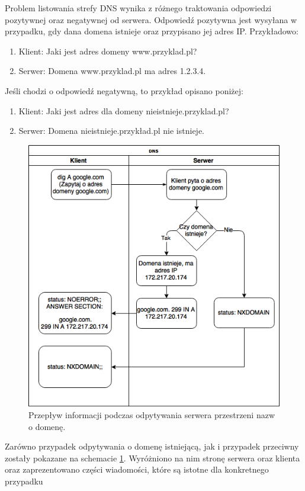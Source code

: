 Problem listowania strefy DNS wynika z różnego traktowania odpowiedzi pozytywnej oraz negatywnej od serwera. Odpowiedź pozytywna
jest wysyłana w przypadku, gdy dana domena istnieje oraz przypisano jej adres IP. Przykładowo:
\begin{enumerate}
	\item Klient: Jaki jest adres domeny www.przyklad.pl?
	\item Serwer: Domena www.przyklad.pl ma adres 1.2.3.4.
\end{enumerate}
Jeśli chodzi o odpowiedź negatywną, to przykład opisano poniżej:
\begin{enumerate}
	\item Klient: Jaki jest adres dla domeny nieistnieje.przyklad.pl?
	\item Serwer: Domena nieistnieje.przykład.pl nie istnieje.
\end{enumerate}
\begin{center}
	\begin{figure}
	\centering
	\includegraphics[scale=0.7]{image/nxdomain}
	\caption{Przepływ informacji podczas odpytywania serwera przestrzeni nazw o domenę.}
	\label{fig:dns_nxdomain}
	\end{figure}
\end{center}

Zarówno przypadek odpytywania o domenę istniejącą, jak i przypadek przeciwny zostały pokazane na schemacie \ref{fig:dns_nxdomain}.
Wyróżniono na nim stronę serwera oraz klienta oraz zaprezentowano części wiadomości, które są istotne dla konkretnego przypadku

